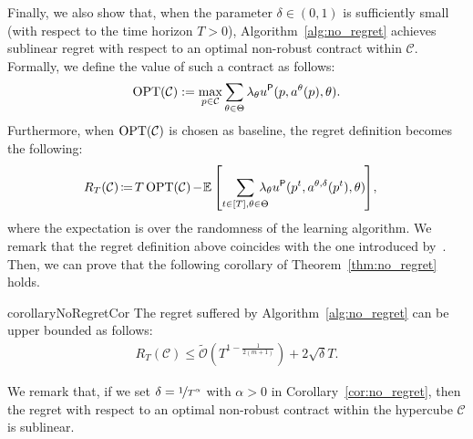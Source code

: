 Finally, we also show that, when the parameter $\delta \in (0,1)$ is sufficiently small (with respect to the time horizon $T>0$), Algorithm~\ref{alg:no_regret} achieves sublinear regret with respect to an optimal non-robust contract within $\mathcal{C}$.
%
Formally, we define the value of such a contract as follows:
%
$$
\textnormal{OPT}(\mathcal{C}) := \max_{p \in \mathcal{C}}  \sum_{\theta \in \Theta}\lambda_\theta u^{\mathsf{P}}(p, a^\theta(p),\theta).
$$
Furthermore, when $\textnormal{OPT}(\mathcal{C})$ is chosen as baseline, the regret definition becomes the following:
%
\begin{align*}
	R_T(\mathcal{C}) \hspace{-0.5mm}&\coloneqq \hspace{-0.5mm} T \, \textnormal{OPT}(\mathcal{C})\hspace{-0.3mm}-  \hspace{-0.3mm}\hspace{-0.3mm} \mathbb{E}\left[\sum_{t \in [T],\theta \in \Theta} \hspace{-3.2mm}\lambda_\theta u^\sfP(p^t, a^{\theta,\delta}(p^t),\theta) \hspace{-0.3mm} \right] \hspace{-0.5mm},
\end{align*}
%
where the expectation is over the randomness of the learning algorithm.
%
We remark that the regret definition above coincides with the one introduced by~\citet{Zhu2023Sample}.
%
Then, we can prove that the following corollary of Theorem~\ref{thm:no_regret} holds.
%
\begin{restatable}{corollary}{NoRegretCor}\label{cor:no_regret}
	The regret suffered by Algorithm~\ref{alg:no_regret} can be upper bounded as follows:
	\begin{align*}
		R_T (\mathcal{C})  \le \mathcal{\widetilde{O}} \left(   T^{1- \frac{1}{2(m+1)}}  \right) +  2 \sqrt{\delta} T.
	\end{align*}
\end{restatable}
%
We remark that, if we set $\delta = \nicefrac{1}{T^\alpha}$ with $\alpha>0$ in Corollary~\ref{cor:no_regret}, then the regret with respect to an optimal non-robust contract within the hypercube $\mathcal{C}$ is sublinear.


